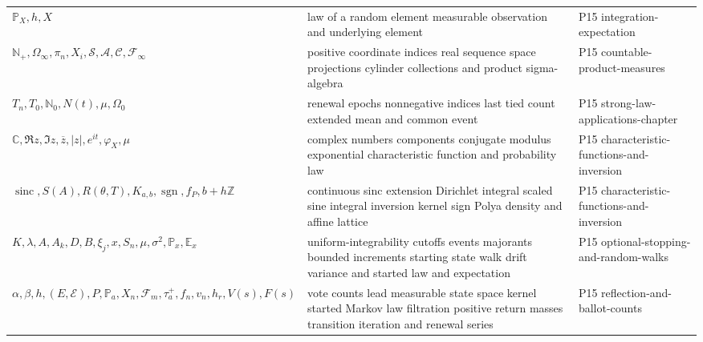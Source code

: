 \begin{longtable}{@{}p{}p{}p{}@{}}
\(\mathbb P_X,\allowbreak h,\allowbreak X\) & law of a random element measurable observation and underlying element & P15 integration-\allowbreak{}expectation \\
\(\mathbb N_+,\allowbreak \Omega_\infty,\allowbreak \pi_n,\allowbreak X_i,\allowbreak \mathcal S,\allowbreak \mathcal A,\allowbreak \mathcal C,\allowbreak \mathcal F_\infty\) & positive coordinate indices real sequence space projections cylinder collections and product sigma-algebra & P15 countable-\allowbreak{}product-\allowbreak{}measures \\
\(T_n,\allowbreak T_0,\allowbreak \mathbb N_0,\allowbreak N(t),\allowbreak \mu,\allowbreak \Omega_0\) & renewal epochs nonnegative indices last tied count extended mean and common event & P15 strong-\allowbreak{}law-\allowbreak{}applications-\allowbreak{}chapter \\
\(\mathbb C,\allowbreak \Re z,\allowbreak \Im z,\allowbreak \overline z,\allowbreak |z|,\allowbreak e^{it},\allowbreak \varphi_X,\allowbreak \mu\) & complex numbers components conjugate modulus exponential characteristic function and probability law & P15 characteristic-\allowbreak{}functions-\allowbreak{}and-\allowbreak{}inversion \\
\(\operatorname{sinc},\allowbreak S(A),\allowbreak R(\theta,\allowbreak T),\allowbreak K_{a,b},\allowbreak \operatorname{sgn},\allowbreak f_P,\allowbreak b+h\mathbb Z\) & continuous sinc extension Dirichlet integral scaled sine integral inversion kernel sign Polya density and affine lattice & P15 characteristic-\allowbreak{}functions-\allowbreak{}and-\allowbreak{}inversion \\
\(K,\allowbreak \lambda,\allowbreak A,\allowbreak A_k,\allowbreak D,\allowbreak B,\allowbreak \xi_j,\allowbreak x,\allowbreak S_n,\allowbreak \mu,\allowbreak \sigma^2,\allowbreak \mathbb P_x,\allowbreak \mathbb E_x\) & uniform-integrability cutoffs events majorants bounded increments starting state walk drift variance and started law and expectation & P15 optional-\allowbreak{}stopping-\allowbreak{}and-\allowbreak{}random-\allowbreak{}walks \\
\(\alpha,\allowbreak \beta,\allowbreak h,\allowbreak (E,\allowbreak \mathcal E),\allowbreak P,\allowbreak \mathbb P_a,\allowbreak X_n,\allowbreak \mathcal F_m,\allowbreak \tau_a^+,\allowbreak f_n,\allowbreak v_n,\allowbreak h_r,\allowbreak V(s),\allowbreak F(s)\) & vote counts lead measurable state space kernel started Markov law filtration positive return masses transition iteration and renewal series & P15 reflection-\allowbreak{}and-\allowbreak{}ballot-\allowbreak{}counts \\

\end{longtable}
